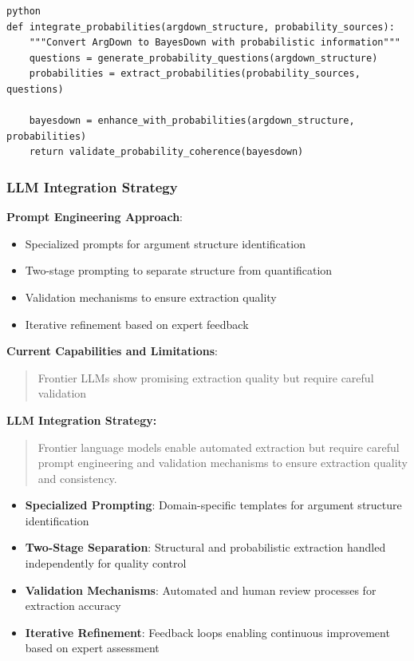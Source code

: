 \documentclass[
  11pt,
  letterpaper,
]{book}
\providecommand{\tightlist}{%
  \setlength{\itemsep}{0pt}\setlength{\parskip}{0pt}}
\begin{document}
\begin{verbatim}
python
def integrate_probabilities(argdown_structure, probability_sources):
    """Convert ArgDown to BayesDown with probabilistic information"""
    questions = generate_probability_questions(argdown_structure)
    probabilities = extract_probabilities(probability_sources, questions)
    
    bayesdown = enhance_with_probabilities(argdown_structure, probabilities)
    return validate_probability_coherence(bayesdown)
\end{verbatim}

\subsubsection{LLM Integration Strategy}\label{sec-llm-integration}

\textbf{Prompt Engineering Approach}:

\begin{itemize}
\tightlist
\item
  Specialized prompts for argument structure identification
\item
  Two-stage prompting to separate structure from quantification
\item
  Validation mechanisms to ensure extraction quality
\item
  Iterative refinement based on expert feedback
\end{itemize}

\textbf{Current Capabilities and Limitations}:

\begin{quote}
Frontier LLMs show promising extraction quality but require careful
validation
\end{quote}

\textbf{LLM Integration Strategy:}

\begin{quote}
Frontier language models enable automated extraction but require careful
prompt engineering and validation mechanisms to ensure extraction
quality and consistency.
\end{quote}

\begin{itemize}
\tightlist
\item
  \textbf{Specialized Prompting}: Domain-specific templates for argument
  structure identification
\item
  \textbf{Two-Stage Separation}: Structural and probabilistic extraction
  handled independently for quality control
\item
  \textbf{Validation Mechanisms}: Automated and human review processes
  for extraction accuracy
\item
  \textbf{Iterative Refinement}: Feedback loops enabling continuous
  improvement based on expert assessment
\end{itemize}
\end{document}
